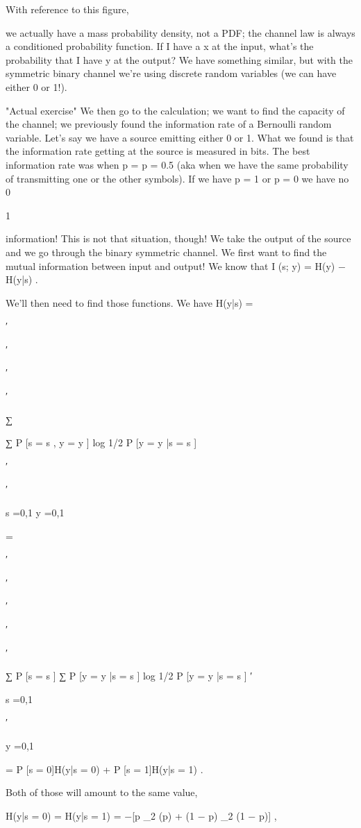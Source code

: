 {{{With reference to this figure,

we actually have a mass probability density, not a PDF; the channel law is always a conditioned probability function. If I have a x at the input, what's the probability that I have y at the output?
We have something similar, but with the symmetric binary channel we're using discrete random variables (we can have either 0 or 1!).

"Actual exercise"
We then go to the calculation; we want to find the capacity of the channel; we previously found the information rate of a Bernoulli random variable.
Let's say we have a source emitting either 0 or 1. What we found is that the information rate getting at the source is measured in bits.
The best information rate was when p = p = 0.5 (aka when we have the same probability of transmitting one or the other symbols). If we have p = 1 or p = 0 we have no 0

1

information! This is not that situation, though!
We take the output of the source and we go through the binary symmetric channel. We first want to find the mutual information between input and output!
We know that I (s; y) = H(y) − H(y|s) .

We'll then need to find those functions. We have H(y|s) =

′

′

′

′

∑

∑ P [s = s , y = y ] log 1/2 P [y = y |s = s ]

′

′

s =0,1 y =0,1

=

′

′

′

′

′

∑ P [s = s ] ∑ P [y = y |s = s ] log 1/2 P [y = y |s = s ]
′

s =0,1

′

y =0,1

= P [s = 0]H(y|s = 0) + P [s = 1]H(y|s = 1) .

Both of those will amount to the same value,

H(y|s = 0) = H(y|s = 1) = −[p \log_2 (p) + (1 − p) \log_2 (1 − p)] ,

}}}
